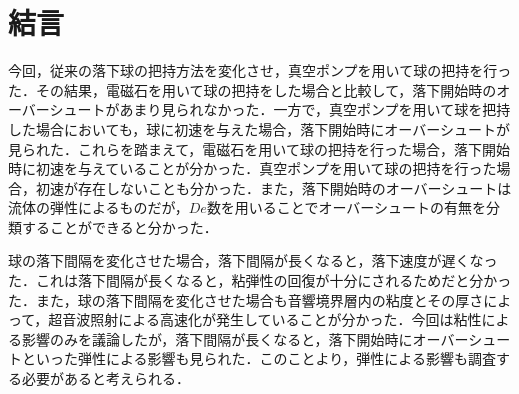 \clearpage
\section{結言}

今回，従来の落下球の把持方法を変化させ，真空ポンプを用いて球の把持を行った．その結果，電磁石を用いて球の把持をした場合と比較して，落下開始時のオーバーシュートがあまり見られなかった．一方で，真空ポンプを用いて球を把持した場合においても，球に初速を与えた場合，落下開始時にオーバーシュートが見られた．これらを踏まえて，電磁石を用いて球の把持を行った場合，落下開始時に初速を与えていることが分かった．真空ポンプを用いて球の把持を行った場合，初速が存在しないことも分かった．また，落下開始時のオーバーシュートは流体の弾性によるものだが，$De$数を用いることでオーバーシュートの有無を分類することができると分かった．

球の落下間隔を変化させた場合，落下間隔が長くなると，落下速度が遅くなった．これは落下間隔が長くなると，粘弾性の回復が十分にされるためだと分かった．また，球の落下間隔を変化させた場合も音響境界層内の粘度とその厚さによって，超音波照射による高速化が発生していることが分かった．今回は粘性による影響のみを議論したが，落下間隔が長くなると，落下開始時にオーバーシュートといった弾性による影響も見られた．このことより，弾性による影響も調査する必要があると考えられる．

